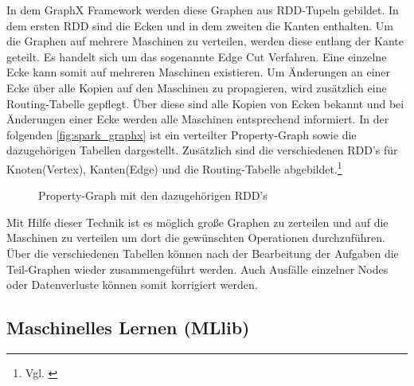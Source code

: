 \noindent
In dem GraphX Framework werden diese Graphen aus RDD-Tupeln gebildet. In dem ersten RDD sind die Ecken und in dem zweiten die Kanten enthalten. Um die Graphen auf mehrere Maschinen zu verteilen, werden diese entlang der Kante geteilt. Es handelt sich um das sogenannte Edge Cut Verfahren. Eine einzelne Ecke kann somit auf mehreren Maschinen existieren. Um Änderungen an einer Ecke über alle Kopien auf den Maschinen zu propagieren, wird zusätzlich eine Routing-Tabelle gepflegt. Über diese sind alle Kopien von Ecken bekannt und bei Änderungen einer Ecke werden alle Maschinen entsprechend informiert. 
In der folgenden \autoref{fig:spark_graphx} ist ein verteilter Property-Graph sowie die dazugehörigen Tabellen dargestellt. Zusätzlich sind die verschiedenen RDD's für Knoten(Vertex), Kanten(Edge) und die Routing-Tabelle abgebildet.\footnote{Vgl. \cite{AAWS15}} \\

\begin{figure}[h]
  \centering
  \caption{Property-Graph mit den dazugehörigen RDD's \cite{SPGRAPHX}}\label{fig:spark_graphx}
\end{figure}

\noindent
Mit Hilfe dieser Technik ist es möglich große Graphen zu zerteilen und auf die Maschinen zu verteilen um dort die gewünschten Operationen durchzuführen. Über die verschiedenen Tabellen können nach der Bearbeitung der Aufgaben die Teil-Graphen wieder zusammengeführt werden. Auch Ausfälle einzelner Nodes oder Datenverluste können somit korrigiert werden. \\



\newpage
\subsection{Maschinelles Lernen (MLlib)}\label{sec_sparkmlib}

